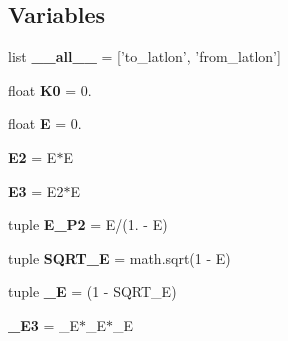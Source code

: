 \subsection*{Variables}
\begin{DoxyCompactItemize}
\item 
\hypertarget{namespacecore_1_1misc_1_1utm_acba314876ed7eebaaa1cfd87f29eed5a}{list {\bfseries \+\_\+\+\_\+all\+\_\+\+\_\+} = \mbox{[}'to\+\_\+latlon', 'from\+\_\+latlon'\mbox{]}}\label{namespacecore_1_1misc_1_1utm_acba314876ed7eebaaa1cfd87f29eed5a}

\item 
\hypertarget{namespacecore_1_1misc_1_1utm_a75c104baf34a31e1a955f25b7d36766c}{float {\bfseries K0} = 0.}\label{namespacecore_1_1misc_1_1utm_a75c104baf34a31e1a955f25b7d36766c}

\item 
\hypertarget{namespacecore_1_1misc_1_1utm_a8163c054a8a454e2c2db0a0096dc3d49}{float {\bfseries E} = 0.}\label{namespacecore_1_1misc_1_1utm_a8163c054a8a454e2c2db0a0096dc3d49}

\item 
\hypertarget{namespacecore_1_1misc_1_1utm_a6b831f2002ccbc067f1cc46e24ba1107}{{\bfseries E2} = E$\ast$E}\label{namespacecore_1_1misc_1_1utm_a6b831f2002ccbc067f1cc46e24ba1107}

\item 
\hypertarget{namespacecore_1_1misc_1_1utm_a2f287fc4c228e3deca8c393af1371088}{{\bfseries E3} = E2$\ast$E}\label{namespacecore_1_1misc_1_1utm_a2f287fc4c228e3deca8c393af1371088}

\item 
\hypertarget{namespacecore_1_1misc_1_1utm_af8a9a855070df4e4f14cd856fe1b3f76}{tuple {\bfseries E\+\_\+\+P2} = E/(1. -\/ E)}\label{namespacecore_1_1misc_1_1utm_af8a9a855070df4e4f14cd856fe1b3f76}

\item 
\hypertarget{namespacecore_1_1misc_1_1utm_a9b9ad3c7670ab5ddcc40ff085282bb81}{tuple {\bfseries S\+Q\+R\+T\+\_\+\+E} = math.\+sqrt(1 -\/ E)}\label{namespacecore_1_1misc_1_1utm_a9b9ad3c7670ab5ddcc40ff085282bb81}

\item 
\hypertarget{namespacecore_1_1misc_1_1utm_ad4cd1c8751bd1d8b9cc78224d5d76146}{tuple {\bfseries \+\_\+\+E} = (1 -\/ S\+Q\+R\+T\+\_\+\+E)}\label{namespacecore_1_1misc_1_1utm_ad4cd1c8751bd1d8b9cc78224d5d76146}

\item 
\hypertarget{namespacecore_1_1misc_1_1utm_aa90ba4e75714cda0688a0b8f4295fc68}{{\bfseries \+\_\+\+E3} = \+\_\+\+E$\ast$\+\_\+\+E$\ast$\+\_\+\+E}\label{namespacecore_1_1misc_1_1utm_aa90ba4e75714cda0688a0b8f4295fc68}


\end{DoxyCompactItemize}
